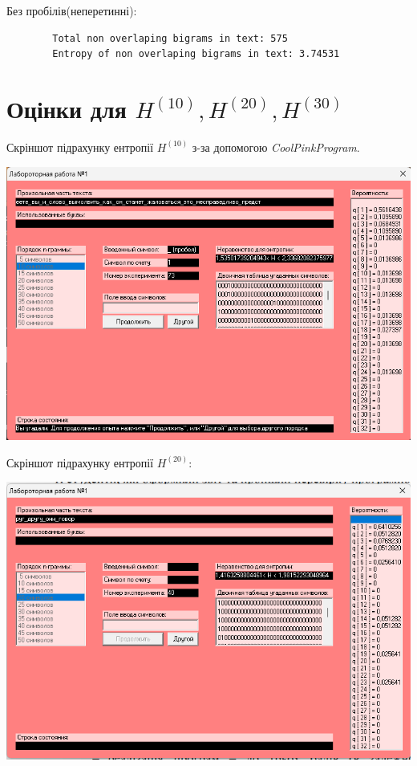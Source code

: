 \documentclass[12pt]{article}
\begin{document}
    Без пробілів(неперетинні):

    \begin{verbatim}
        Total non overlaping bigrams in text: 575
        Entropy of non overlaping bigrams in text: 3.74531
    \end{verbatim}

    \section{Оцінки для $H^{(10)}, H^{(20)}, H^{(30)}$}

    Скріншот підрахунку ентропії $H^{(10)}$ з-за допомогою \textit{CoolPinkProgram}.

    \begin{center}
        \includegraphics[scale=0.6]{Ентропія 10-грами.png}
    \end{center}

    Скріншот підрахунку ентропії $H^{(20)}$:

    \begin{center}
        \includegraphics[scale=0.6]{Ентропія 20-грами.png}
    \end{center}
\end{document}
